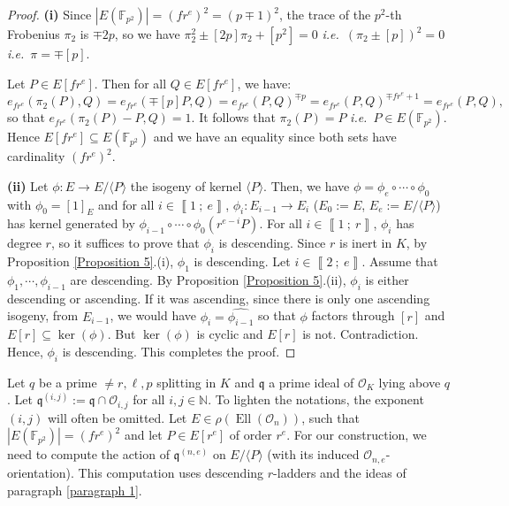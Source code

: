 \documentclass[a4paper,10pt]{report}
\theoremstyle{definition}
\theoremstyle{plain}
\theoremstyle{definition}
\newcommand{\ie}{\emph{i.e.}\ }
\newcommand{\N}{\mathbb{N}}
\newcommand{\F}{\mathbb{F}}
\newcommand{\mO}{\mathcal{O}}
\renewcommand{\i}[2]{\left\llbracket #1~;~#2\right\rrbracket}
\renewcommand{\(}{\left(}
\renewcommand{\)}{\right)}
\newcommand{\mf}[1]{\mathfrak{#1}}
\DeclareMathOperator{\Ell}{Ell}
\begin{document}
\begin{proof}
\textbf{(i)} Since $|E(\F_{p^2})|=(f r^e)^2=(p\mp 1)^2$, the trace of the $p^2$-th Frobenius $\pi_2$ is $\mp 2p$, so we have $\pi_2^2\pm [2p]\pi_2+[p^2]=0$ \ie $(\pi_2\pm[p])^2=0$ \ie $\pi=\mp[p]$. 

Let $P\in E[fr^e]$. Then for all $Q\in E[fr^e]$, we have:
\[e_{fr^e}(\pi_2(P),Q)=e_{fr^e}(\mp[p]P,Q)= e_{fr^e}(P,Q)^{\mp p}=e_{fr^e}(P,Q)^{\mp fr^e+1}=e_{fr^e}(P,Q),\]
so that $e_{fr^e}(\pi_2(P)-P,Q)=1$. It follows that $\pi_2(P)=P$ \ie $P\in E(\F_{p^2})$. Hence $E[fr^e]\subseteq E(\F_{p^2})$ and we have an equality since both sets have cardinality $(fr^e)^2$.

\textbf{(ii)} Let $\phi : E\longrightarrow E/\langle P\rangle$ the isogeny of kernel $\langle P\rangle$. Then, we have $\phi=\phi_e\circ\cdots\circ\phi_0$ with $\phi_0=[1]_E$ and for all $i\in\i{1}{e}$, $\phi_i :E_{i-1}\longrightarrow E_i$ ($E_0:=E$, $E_e:=E/\langle P\rangle$) has kernel generated by $\phi_{i-1}\circ\cdots\circ\phi_0(r^{e-i}P)$. For all $i\in\i{1}{r}$, $\phi_i$ has degree $r$, so it suffices to prove that $\phi_i$ is descending.  Since $r$ is inert in $K$, by Proposition \ref{Proposition 5}.(i), $\phi_1$ is descending. Let $i\in\i{2}{e}$. Assume that $\phi_1, \cdots, \phi_{i-1}$ are descending. By Proposition \ref{Proposition 5}.(ii), $\phi_i$ is either descending or ascending. If it was ascending, since there is only one ascending isogeny, from $E_{i-1}$, we would have $\phi_i=\widehat{\phi_{i-1}}$ so that $\phi$ factors through $[r]$ and $E[r]\subseteq \ker(\phi)$. But $\ker(\phi)$ is cyclic and $E[r]$ is not. Contradiction. Hence, $\phi_i$ is descending. This completes the proof.
\end{proof}

Let $q$ be a prime $\neq r,\ell, p$ splitting in $K$ and $\mf{q}$ a prime ideal of $\mO_K$ lying above $q$. Let $\mf{q}^{(i,j)}:=\mf{q}\cap\mO_{i,j}$ for all $i, j\in\N$. To lighten the notations, the exponent $(i,j)$ will often be omitted. Let $E\in\rho(\Ell(\mO_n))$, such that $|E(\F_{p^2})|=(f r^e)^2$ and let $P\in E[r^e]$ of order $r^e$. For our construction, we need to compute the action of $\mf{q}^{(n,e)}$ on $E/\langle P\rangle$ (with its induced $\mO_{n,e}$-orientation).  This computation uses descending $r$-ladders and the ideas of paragraph \ref{paragraph 1}.
\end{document}
